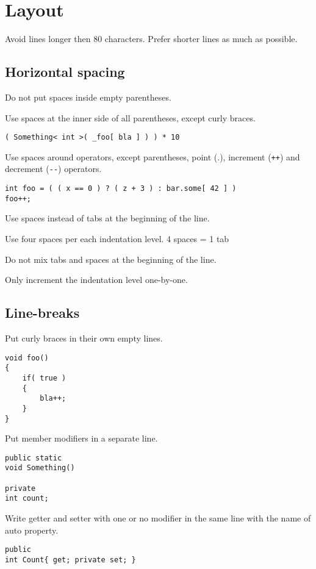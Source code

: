 \documentclass[11pt,a4paper]{book}
\begin{document}
\section{Layout}

\avoidmark Avoid lines longer then 80 characters. Prefer shorter lines as much as possible.

\subsection{Horizontal spacing}

\notmark Do not put spaces inside empty parentheses.

\domark Use spaces at the inner side of all parentheses, except curly braces.
\begin{verbatim}
( Something< int >( _foo[ bla ] ) ) * 10
\end{verbatim}

\domark Use spaces around operators, except parentheses, point (.), increment (\verb|++|) and decrement (\verb|--|) operators.
\begin{verbatim}
int foo = ( ( x == 0 ) ? ( z + 3 ) : bar.some[ 42 ] )
foo++;
\end{verbatim}

\domark Use spaces instead of tabs at the beginning of the line.

\domark Use four spaces per each indentation level. 4 spaces = 1 tab

\notmark Do not mix tabs and spaces at the beginning of the line.

\domark Only increment the indentation level one-by-one.

\subsection{Line-breaks}

\domark Put curly braces in their own empty lines.
\begin{verbatim}
void foo()
{
    if( true )
    {
        bla++;
    }
}
\end{verbatim}

\domark Put member modifiers in a separate line.
\begin{verbatim}
public static
void Something()

private
int count;
\end{verbatim}

\domark Write getter and setter with one or no modifier in the same line with the name of auto property.
\begin{verbatim}
public
int Count{ get; private set; }
\end{verbatim}
\end{document}

